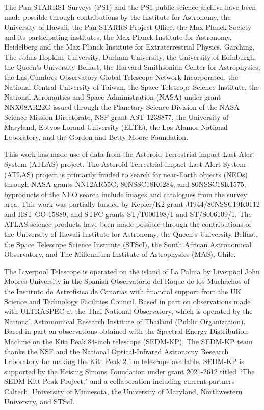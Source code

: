 \documentclass{nature_plusfigure}
\begin{document}
\begin{addendum}
The Pan-STARRS1 Surveys (PS1) and the PS1 public science archive have been made possible through contributions by the Institute for Astronomy, the University of Hawaii, the Pan-STARRS Project Office, the Max-Planck Society and its participating institutes, the Max Planck Institute for Astronomy, Heidelberg and the Max Planck Institute for Extraterrestrial Physics, Garching, The Johns Hopkins University, Durham University, the University of Edinburgh, the Queen's University Belfast, the Harvard-Smithsonian Center for Astrophysics, the Las Cumbres Observatory Global Telescope Network Incorporated, the National Central University of Taiwan, the Space Telescope Science Institute, the National Aeronautics and Space Administration (NASA) under grant NNX08AR22G issued through the Planetary Science Division of the NASA Science Mission Directorate, NSF grant AST-1238877, the University of Maryland, Eotvos Lorand University (ELTE), the Los Alamos National Laboratory, and the Gordon and Betty Moore Foundation.

This work has made use of data from the Asteroid Terrestrial-impact Last Alert System (ATLAS) project. The Asteroid Terrestrial-impact Last Alert System (ATLAS) project is primarily funded to search for near-Earth objects (NEOs) through NASA grants NN12AR55G, 80NSSC18K0284, and 80NSSC18K1575; byproducts of the NEO search include images and catalogues from the survey area. This work was partially funded by Kepler/K2 grant J1944/80NSSC19K0112 and HST GO-15889, and STFC grants ST/T000198/1 and ST/S006109/1. The ATLAS science products have been made possible through the contributions of the University of Hawaii Institute for Astronomy, the Queen’s University Belfast, the Space Telescope Science Institute (STScI), the South African Astronomical Observatory, and The Millennium Institute of Astrophysics (MAS), Chile.

The Liverpool Telescope is operated on the island of La Palma by Liverpool John Moores University in the Spanish Observatorio del Roque de los Muchachos of the Instituto de Astrofisica de Canarias with financial support from the UK Science and Technology Facilities Council.
%
Based in part on observations made with ULTRASPEC at the Thai National Observatory, which is operated by the National Astronomical Research Institute of Thailand (Public Organization).
%
Based in part on observations obtained with the Spectral Energy Distribution
Machine on the Kitt Peak 84-inch telescope (SEDM-KP). The SEDM-KP team
thanks the NSF and the National
Optical-Infrared Astronomy Research Laboratory for making the Kitt
Peak 2.1\,m telescope available. SEDM-KP is supported by the Heising
Simons Foundation under grant 2021-2612 titled ``The SEDM Kitt
Peak Project,"
and a collaboration including current partners Caltech, University of
Minnesota, the
University of Maryland, Northwestern University, and STScI.


\end{addendum}
\end{document}
